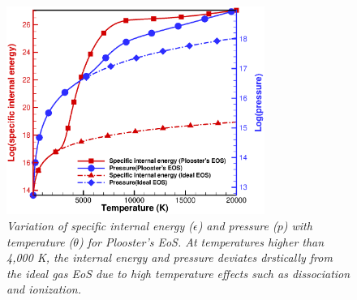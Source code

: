 \documentclass[12pt]{aiaa-tc}
\begin{document}
\begin{figure}
    \centering
    \includegraphics[width = 0.75\textwidth]{PIE}
    \caption{\textit{Variation of specific internal energy ($\epsilon$) and pressure ($p$) with temperature ($\theta$) for Plooster's EoS. At temperatures higher than 4,000 K, the internal energy and pressure deviates drstically from the ideal gas EoS due to high temperature effects such as dissociation and ionization. }}
    \label{fig:my_label}
\end{figure}
\end{document}
